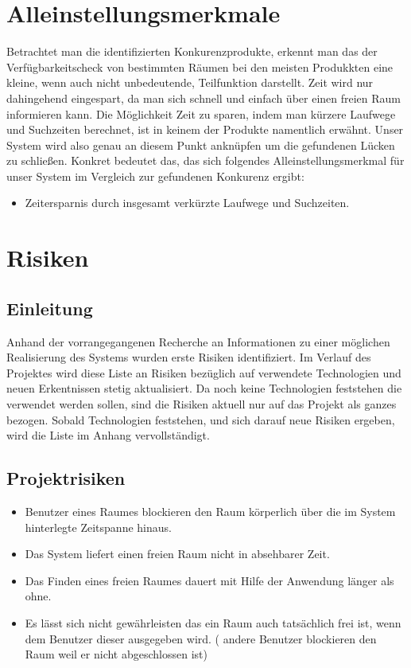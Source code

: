 \section{Alleinstellungsmerkmale}
\label{sec:Alleinstellungsmerkmale}

Betrachtet man die identifizierten Konkurenzprodukte, erkennt man das der
Verfügbarkeitscheck von bestimmten Räumen bei den meisten Produkkten eine
kleine, wenn auch nicht unbedeutende, Teilfunktion darstellt. Zeit wird nur
dahingehend eingespart, da man sich schnell und einfach über einen freien Raum
informieren kann. Die Möglichkeit Zeit zu sparen, indem man kürzere Laufwege
und Suchzeiten berechnet, ist in keinem der Produkte namentlich erwähnt.
Unser System wird also genau an diesem Punkt anknüpfen um die gefundenen Lücken
zu schließen. Konkret bedeutet das, das sich folgendes Alleinstellungsmerkmal
für unser System im Vergleich zur gefundenen Konkurenz ergibt:

\begin{itemize}
	\item Zeitersparnis durch insgesamt verkürzte Laufwege und Suchzeiten.
\end{itemize}


\section{Risiken}
\label{sec:Risiken}

\subsection{Einleitung}
\label{sec:Risiken_Einleitung}

Anhand der vorrangegangenen Recherche an Informationen zu einer möglichen
Realisierung des Systems wurden erste Risiken identifiziert. Im Verlauf des
Projektes wird diese Liste an Risiken bezüglich auf verwendete Technologien
und neuen Erkentnissen stetig aktualisiert. Da noch keine Technologien
feststehen die verwendet werden sollen, sind die Risiken aktuell nur auf das
Projekt als ganzes bezogen. Sobald Technologien feststehen, und sich darauf
neue Risiken ergeben, wird die Liste im Anhang vervollständigt.

\subsection{Projektrisiken}
\label{sec:Projektrisiken}

\begin{itemize}
	\item Benutzer eines Raumes blockieren den Raum körperlich über die im System hinterlegte Zeitspanne hinaus.
	\item Das System liefert einen freien Raum nicht in absehbarer Zeit.
	\item Das Finden eines freien Raumes dauert mit Hilfe der Anwendung länger als ohne.
	\item Es lässt sich nicht gewährleisten das ein Raum auch tatsächlich frei ist, wenn dem Benutzer
	dieser ausgegeben wird. ( andere Benutzer blockieren den Raum \zB weil er nicht abgeschlossen ist)
\end{itemize}